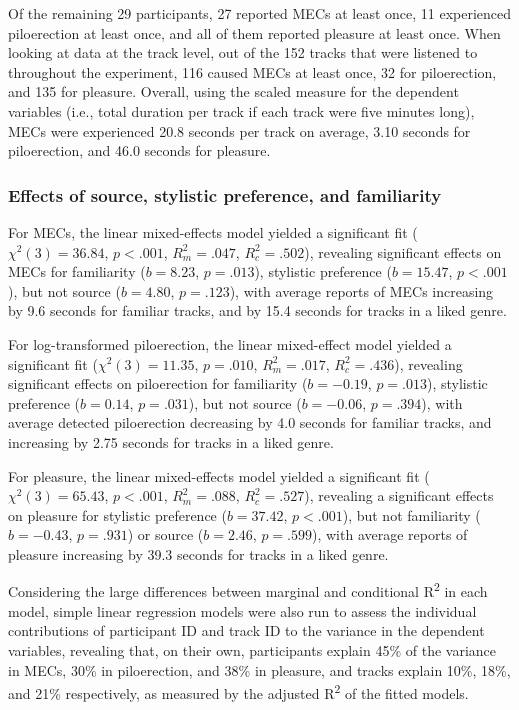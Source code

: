 Of the remaining 29 participants, 27 reported MECs at least once, 11 experienced piloerection at least once, and all of them reported pleasure at least once. When looking at data at the track level, out of the 152 tracks that were listened to throughout the experiment, 116 caused MECs at least once, 32 for piloerection, and 135 for pleasure. Overall, using the scaled measure for the dependent variables (i.e., total duration per track if each track were five minutes long), MECs were experienced 20.8 seconds per track on average, 3.10 seconds for piloerection, and 46.0 seconds for pleasure.

\subsubsection{Effects of source, stylistic preference, and familiarity}

For MECs, the linear mixed-effects model yielded a significant fit ($\chi^2(3) = 36.84$, $p < .001$, $R^2_m = .047$, $R^2_c = .502$), revealing significant effects on MECs for familiarity ($b = 8.23$, $p = .013$), stylistic preference ($b = 15.47$, $p < .001$), but not source ($b = 4.80$, $p = .123$), with average reports of MECs increasing by 9.6 seconds for familiar tracks, and by 15.4 seconds for tracks in a liked genre. 

For log-transformed piloerection, the linear mixed-effect model yielded a significant fit ($\chi^2(3) = 11.35$, $p = .010$, $R^2_m = .017$, $R^2_c = .436$), revealing significant effects on piloerection for familiarity ($b = -0.19$, $p = .013$), stylistic preference ($b = 0.14$, $p = .031$), but not source ($b = -0.06$, $p = .394$), with average detected piloerection decreasing by 4.0 seconds for familiar tracks, and increasing by 2.75 seconds for tracks in a liked genre. 

For pleasure, the linear mixed-effects model yielded a significant fit ($\chi^2(3) = 65.43$, $p < .001$, $R^2_m = .088$, $R^2_c = .527$), revealing a significant effects on pleasure for stylistic preference ($b = 37.42$, $p < .001$), but not familiarity ($b = -0.43$, $p = .931$) or source ($b = 2.46$, $p = .599$), with average reports of pleasure increasing by 39.3 seconds for tracks in a liked genre.

Considering the large differences between marginal and conditional R\textsuperscript{2} in each model, simple linear regression models were also run to assess the individual contributions of participant ID and track ID to the variance in the dependent variables, revealing that, on their own, participants explain 45\% of the variance in MECs, 30\% in piloerection, and 38\% in pleasure, and tracks explain 10\%, 18\%, and 21\% respectively, as measured by the adjusted R\textsuperscript{2} of the fitted models.

